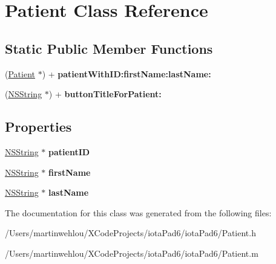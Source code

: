\hypertarget{interface_patient}{
\section{Patient Class Reference}
\label{interface_patient}
}
\subsection*{Static Public Member Functions}
\begin{DoxyCompactItemize}
\item 
\hypertarget{interface_patient_ab6572181d04b873d497e9807e94731b4}{
(\hyperlink{interface_patient}{Patient} $\ast$) + {\bfseries patientWithID:firstName:lastName:}}
\label{interface_patient_ab6572181d04b873d497e9807e94731b4}

\item 
\hypertarget{interface_patient_adbca90657ca2622a6b712781e4da9e1d}{
(\hyperlink{class_n_s_string}{NSString} $\ast$) + {\bfseries buttonTitleForPatient:}}
\label{interface_patient_adbca90657ca2622a6b712781e4da9e1d}

\end{DoxyCompactItemize}
\subsection*{Properties}
\begin{DoxyCompactItemize}
\item 
\hypertarget{interface_patient_a250a404c31f16999f082dd8ecf1bfe22}{
\hyperlink{class_n_s_string}{NSString} $\ast$ {\bfseries patientID}}
\label{interface_patient_a250a404c31f16999f082dd8ecf1bfe22}

\item 
\hypertarget{interface_patient_aa315a476b1531ebdc923ee9ac1a65c7b}{
\hyperlink{class_n_s_string}{NSString} $\ast$ {\bfseries firstName}}
\label{interface_patient_aa315a476b1531ebdc923ee9ac1a65c7b}

\item 
\hypertarget{interface_patient_a80ef31bf9aaff7a72643c82d653f7fa8}{
\hyperlink{class_n_s_string}{NSString} $\ast$ {\bfseries lastName}}
\label{interface_patient_a80ef31bf9aaff7a72643c82d653f7fa8}

\end{DoxyCompactItemize}


The documentation for this class was generated from the following files:\begin{DoxyCompactItemize}
\item 
/Users/martinwehlou/XCodeProjects/iotaPad6/iotaPad6/Patient.h\item 
/Users/martinwehlou/XCodeProjects/iotaPad6/iotaPad6/Patient.m\end{DoxyCompactItemize}

